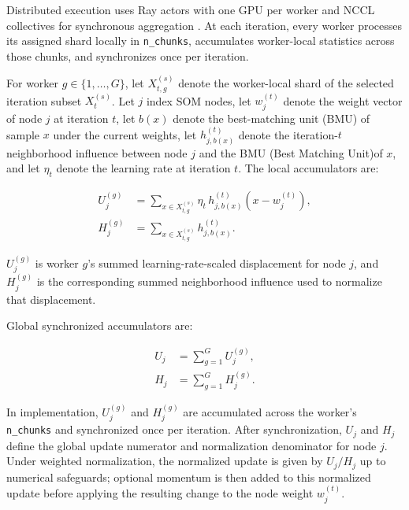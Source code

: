 \documentclass[10pt]{article} %
\begin{document}
Distributed execution uses Ray actors with one GPU per worker and NCCL collectives for synchronous aggregation \citep{moritzRayDistributedFramework2018}. At each iteration, every worker processes its assigned shard locally in \texttt{n\_chunks}, accumulates worker-local statistics across those chunks, and synchronizes once per iteration.

For worker $g \in \{1,\dots,G\}$, let $X_{t,g}^{(s)}$ denote the worker-local shard of the selected iteration subset $X_t^{(s)}$. Let $j$ index SOM nodes, let $w_j^{(t)}$ denote the weight vector of node $j$ at iteration $t$, let $b(x)$ denote the best-matching unit (BMU) of sample $x$ under the current weights, let $h_{j,b(x)}^{(t)}$ denote the iteration-$t$ neighborhood influence between node $j$ and the BMU (Best Matching Unit)of $x$, and let $\eta_t$ denote the learning rate at iteration $t$. The local accumulators are:

\begin{equation*}
\begin{aligned}
 U_j^{(g)} &= \sum_{x \in X_{t,g}^{(s)}} \eta_t\,h_{j,b(x)}^{(t)}(x-w_j^{(t)}), \\
 H_j^{(g)} &= \sum_{x \in X_{t,g}^{(s)}} h_{j,b(x)}^{(t)}.
\end{aligned}
\tag{3}
\end{equation*}

$U_j^{(g)}$ is worker $g$'s summed learning-rate-scaled displacement for node $j$, and $H_j^{(g)}$ is the corresponding summed neighborhood influence used to normalize that displacement.

Global synchronized accumulators are:

\begin{equation*}
\begin{aligned}
U_j &= \sum_{g=1}^{G} U_j^{(g)}, \\
H_j &= \sum_{g=1}^{G} H_j^{(g)}.
\end{aligned}
\tag{4}
\end{equation*}

In implementation, $U_j^{(g)}$ and $H_j^{(g)}$ are accumulated across the worker's \texttt{n\_chunks} and synchronized once per iteration. After synchronization, $U_j$ and $H_j$ define the global update numerator and normalization denominator for node $j$. Under weighted normalization, the normalized update is given by $U_j/H_j$ up to numerical safeguards; optional momentum is then added to this normalized update before applying the resulting change to the node weight $w_j^{(t)}$.
\end{document}
